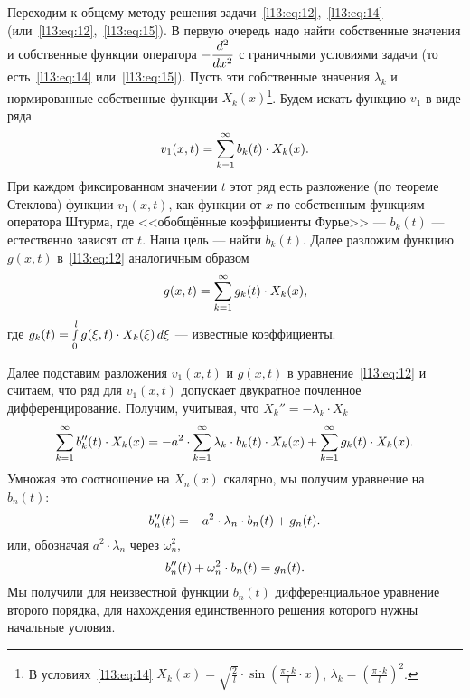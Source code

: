 Переходим к общему методу решения задачи~\eqref{l13:eq:12},~\eqref{l13:eq:14} (или~\eqref{l13:eq:12},~\eqref{l13:eq:15}). В первую очередь надо найти собственные значения и собственные функции оператора $\displaystyle-\frac{d^2}{dx^2}$ с граничными условиями задачи (то есть~\eqref{l13:eq:14} или~\eqref{l13:eq:15}). Пусть эти собственные значения $\lambda_k$ и нормированные собственные функции $X_k(x)$\footnote{В условиях~\eqref{l13:eq:14} $\displaystyle X_k(x)=\sqrt{\frac{2}{l}}\cdot\sin\left(\frac{\pi\cdot k}{l}\cdot x\right)$, $\displaystyle\lambda_k=\left(\frac{\pi\cdot k}{l}\right)^2$.}. Будем искать функцию $v_1$ в виде ряда
\begin{equation*}
	\hfill v_1(x,t)=\sum\limits_{k=1}^{\infty}b_k(t)\cdot X_k(x).\hfill
\end{equation*}
При каждом фиксированном значении $t$ этот ряд есть разложение (по теореме Стеклова) функции $v_1(x,t)$, как функции от $x$ по собственным функциям оператора Штурма, где <<обобщённые коэффициенты Фурье>> --- $b_k(t)$ --- естественно зависят от $t$. Наша цель --- найти $b_k(t)$. Далее разложим функцию $g(x,t)$ в~\eqref{l13:eq:12} аналогичным образом
\begin{equation*}
	\hfill g(x,t)=\sum\limits_{k=1}^{\infty}g_k(t)\cdot X_k(x),\hfill
\end{equation*}
где $\displaystyle g_k(t)=\smallint\limits_0^l g(\xi,t)\cdot X_k(\xi)\,d\xi$ --- известные коэффициенты.

Далее подставим разложения $v_1(x,t)$ и $g(x,t)$ в уравнение~\eqref{l13:eq:12} и считаем, что ряд для $v_1(x,t)$ допускает двукратное почленное дифференцирование. Получим, учитывая, что $X_k''=-\lambda_k\cdot X_k$
\begin{equation*}
	\hfill\sum\limits_{k=1}^{\infty}b_k''(t)\cdot X_k(x)=-a^2\cdot\sum\limits_{k=1}^{\infty} \lambda_k\cdot b_k(t)\cdot X_k(x)+\sum\limits_{k=1}^{\infty}g_k(t)\cdot X_k(x).\hfill
\end{equation*}
Умножая это соотношение на $X_n(x)$ скалярно, мы получим уравнение на $b_n(t)$:
\begin{equation*}
	\hfill b_n''(t)=-a^2\cdot\lambda_n\cdot b_n(t)+g_n(t).\hfill
\end{equation*}
или, обозначая $a^2\cdot\lambda_n$ через $\omega_n^2$,
\begin{equation}\label{l13:eq:19}
	\hfill b_n''(t)+\omega_n^2\cdot b_n(t)=g_n(t).\hfill
\end{equation}
Мы получили для неизвестной функции $b_n(t)$ дифференциальное уравнение второго порядка, для нахождения единственного решения которого нужны начальные условия. 

